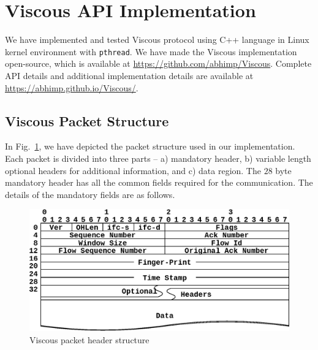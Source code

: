 \section{Viscous API Implementation}
We have implemented and tested Viscous protocol using C++ language in Linux kernel environment with \texttt{pthread}. We have made the Viscous implementation open-source, which is available at \url{https://github.com/abhimp/Viscous}. Complete API details and additional implementation details are available at \url{https://abhimp.github.io/Viscous/}.  



\subsection{Viscous Packet Structure}
In Fig.~\ref{fig:packet_format}, we have depicted the packet structure used in our implementation. 
Each packet is divided into three parts -- a) mandatory header, b) variable length optional headers for additional information, and c) data region. The $28$ byte mandatory header has all the common fields required for the communication. The details of the mandatory fields are as follows. 
%
\begin{figure}[!t]
    \centering
    \includegraphics[width=0.85\linewidth]{img/Packet_format.eps}
    \caption{Viscous packet header structure}
    \label{fig:packet_format}
\end{figure}
 
